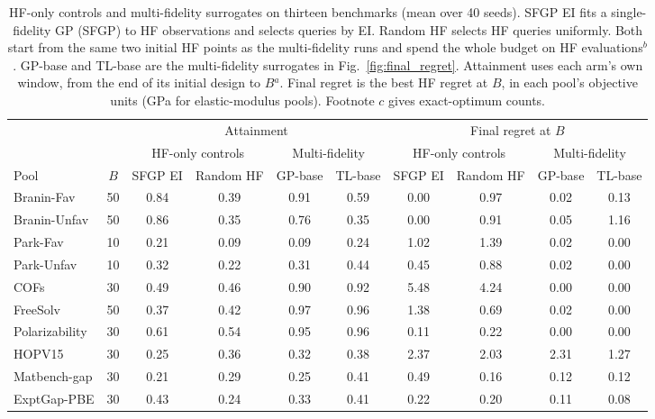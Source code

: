 \begin{table}[p]
\centering
\scriptsize
\caption{HF-only controls and multi-fidelity surrogates on thirteen benchmarks (mean over 40 seeds). SFGP EI fits a single-fidelity GP (SFGP) to HF observations and selects queries by EI. Random HF selects HF queries uniformly. Both start from the same two initial HF points as the multi-fidelity runs and spend the whole budget on HF evaluations$^{b}$. GP-base and TL-base are the multi-fidelity surrogates in Fig.~\ref{fig:final_regret}. Attainment uses each arm's own window, from the end of its initial design to $B$$^{a}$. Final regret is the best HF regret at $B$, in each pool's objective units (GPa for elastic-modulus pools). Footnote $c$ gives exact-optimum counts.}
\label{supptab:hf_only_baselines}
\setlength{\tabcolsep}{3.2pt}%
\begin{tabular}{@{}lc cccc cccc@{}}
\toprule
& & \multicolumn{4}{c}{Attainment} & \multicolumn{4}{c}{Final regret at $B$} \\
\cmidrule(lr){3-6}\cmidrule(lr){7-10}
& & \multicolumn{2}{c}{HF-only controls} & \multicolumn{2}{c}{Multi-fidelity} & \multicolumn{2}{c}{HF-only controls} & \multicolumn{2}{c}{Multi-fidelity} \\
\cmidrule(lr){3-4}\cmidrule(lr){5-6}\cmidrule(lr){7-8}\cmidrule(lr){9-10}
Pool & $B$ & SFGP EI & Random HF & GP-base & TL-base & SFGP EI & Random HF & GP-base & TL-base \\
\midrule
Branin-Fav & 50 & 0.84 & 0.39 & 0.91 & 0.59 & 0.00 & 0.97 & 0.02 & 0.13 \\
Branin-Unfav & 50 & 0.86 & 0.35 & 0.76 & 0.35 & 0.00 & 0.91 & 0.05 & 1.16 \\
Park-Fav & 10 & 0.21 & 0.09 & 0.09 & 0.24 & 1.02 & 1.39 & 0.02 & 0.00 \\
Park-Unfav & 10 & 0.32 & 0.22 & 0.31 & 0.44 & 0.45 & 0.88 & 0.02 & 0.00 \\
COFs & 30 & 0.49 & 0.46 & 0.90 & 0.92 & 5.48 & 4.24 & 0.00 & 0.00 \\
FreeSolv & 50 & 0.37 & 0.42 & 0.97 & 0.96 & 1.38 & 0.69 & 0.02 & 0.00 \\
Polarizability & 30 & 0.61 & 0.54 & 0.95 & 0.96 & 0.11 & 0.22 & 0.00 & 0.00 \\
HOPV15 & 30 & 0.25 & 0.36 & 0.32 & 0.38 & 2.37 & 2.03 & 2.31 & 1.27 \\
Matbench-gap & 30 & 0.21 & 0.29 & 0.25 & 0.41 & 0.49 & 0.16 & 0.12 & 0.12 \\
ExptGap-PBE & 30 & 0.43 & 0.24 & 0.33 & 0.41 & 0.22 & 0.20 & 0.11 & 0.08 \\

\end{tabular}
\end{table}
